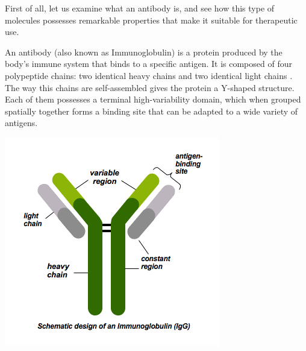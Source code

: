 First of all, let us examine what an antibody is, and see how this
type of molecules possesses remarkable properties that make it suitable
for therapeutic use.

An antibody (also known as Immunoglobulin) is a protein produced by the 
body's immune system that binds to a specific antigen. It is composed of four
polypeptide chains: two identical heavy chains 
and two identical light chains \cite{davies_antibody_1993}. 
The way this chains are self-assembled gives the protein a Y-shaped structure. 
Each of them possesses a terminal high-variability domain, which when grouped spatially
together forms a binding site that can be adapted to a wide variety of antigens.

\includegraphics{../Images/schematics_antibody.png}